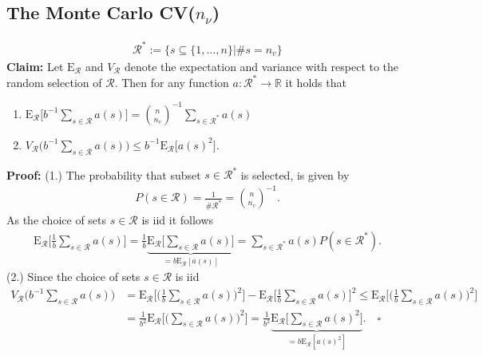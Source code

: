 \documentclass[Research_Module_ES.tex]{subfiles}
\begin{document}
\subsection{The Monte Carlo CV($n_\nu$)}
\begin{align*}
\mathcal{R}^\ast:= \{s\subseteq\{1,\dots,n\}|\# s=n_v\}
\end{align*}
\textbf{Claim:} Let $\mathrm{E}_\mathcal{R}$ and $V_\mathcal{R}$ denote the expectation and variance with respect to the random selection of $\mathcal{R}$. Then for any function $a:\mathcal{R}^\ast\to \mathbb{R}$ it holds that
\begin{enumerate}
\item $\mathrm{E}_\mathcal{R} \bigl[ b^{-1}\sum_{s\in \mathcal{R}}a(s)\bigr] = \binom{n}{n_v}^{-1}\sum_{s\in\mathcal{R}^\ast}a(s)$
\item $V_\mathcal{R} \bigl( b^{-1}\sum_{s\in \mathcal{R}}a(s)\bigr) \le b^{-1} \mathrm{E}_\mathcal{R} \bigl[a(s)^2\bigr]$.
\end{enumerate}
\textbf{Proof:}
(1.) The probability that subset $s \in \mathcal{R}^\ast$ is selected, is given by
\begin{align*}
P(s\in \mathcal{R})= \frac{1}{\# \mathcal{R}^\ast} = \binom{n}{n_v}^{-1}.
\end{align*}
As the choice of sets $s\in \mathcal{R}$ is iid it follows
\begin{align*}
\mathrm{E}_\mathcal{R} \biggl[ \frac{1}{b}\sum_{s\in \mathcal{R}}a(s)\biggr] 
= \frac{1}{b}\underbrace{\mathrm{E}_\mathcal{R} \biggl[\sum_{s\in \mathcal{R}}a(s)\biggr]}_{=b\mathrm{E}_\mathcal{R}[a(s)]}
= \sum_{s\in \mathcal{R}^\ast}a(s)P(s\in \mathcal{R}^\ast).
\end{align*}
(2.) Since the choice of sets $s\in \mathcal{R}$ is iid
\begin{align*}
V_\mathcal{R} \biggl( b^{-1}\sum_{s\in \mathcal{R}}a(s)\biggr)&=\mathrm{E}_\mathcal{R} \biggl[\biggl(\frac{1}{b}\sum_{s\in \mathcal{R}} a(s)\biggr)^2\biggr]-\mathrm{E}_\mathcal{R} \biggl[\frac{1}{b}\sum_{s\in \mathcal{R}} a(s)\biggr]^2
\le \mathrm{E}_\mathcal{R} \biggl[\biggl(\frac{1}{b}\sum_{s\in \mathcal{R}} a(s)\biggr)^2\biggr]\\
&= \frac{1}{b^2} \mathrm{E}_\mathcal{R} \biggl[\biggl(\sum_{s\in \mathcal{R}} a(s)\biggr)^2\biggr]
=\frac{1}{b^2}\underbrace{\mathrm{E}_\mathcal{R} \biggl[\sum_{s\in \mathcal{R}} a(s)^2\biggr]}_{=b\mathrm{E}_\mathcal{R}[a(s)^2]}. \quad \square
\end{align*}
\end{document}
